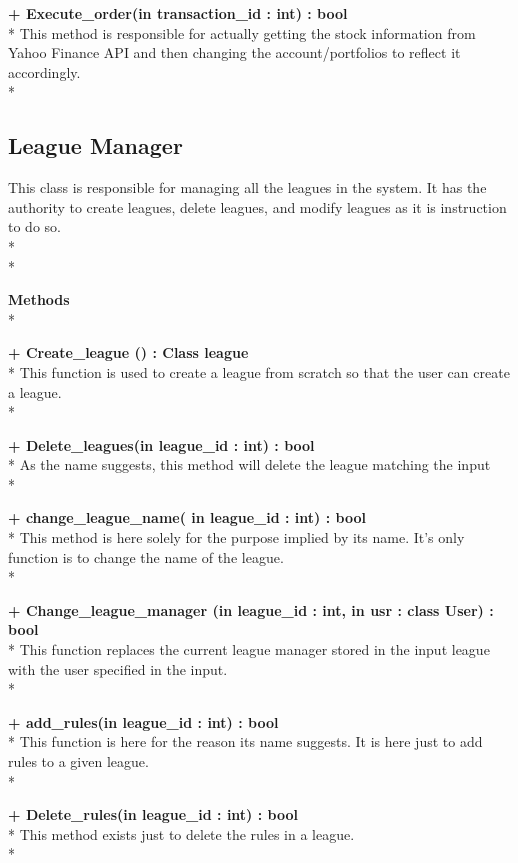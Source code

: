 {\bfseries + Execute_order(in transaction_id : int) : bool } \\*
	This method is responsible for actually getting the stock
    information from Yahoo Finance API and then changing the
    account/portfolios to reflect it accordingly. \\*

\subsection{League Manager}

This class is responsible for managing all the leagues in the system. It has
the authority to create leagues, delete leagues, and modify leagues as it is
instruction to do so. \\* \\*

{\bfseries Methods} \\*

{\bfseries + Create_league () : Class league } \\*
	This function is used to create a league from scratch so that the user can
  create a league. \\*

{\bfseries + Delete_leagues(in league_id : int) : bool } \\*
	As the name suggests, this method will delete the league matching the input\\*

{\bfseries + change_league_name( in league_id : int) : bool } \\*
	This method is here solely for the purpose implied by its
    name.  It’s only function is to change the name of the
    league.  \\*

{\bfseries + Change_league_manager (in league_id : int, in usr : class User) : bool } \\*
	This function replaces the current league manager stored
    in the input league with the user specified in the input. \\*

{\bfseries + add_rules(in league_id : int) : bool } \\*
	This function is here for the reason its name suggests.
    It is here just to add rules to a given league.  \\*

{\bfseries + Delete_rules(in league_id : int) : bool } \\*
	This method exists just to delete the rules in a league.  \\*


